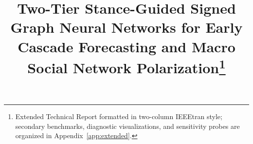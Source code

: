 \documentclass[conference]{IEEEtran}
\begin{document}
\title{Two-Tier Stance-Guided Signed Graph Neural Networks for Early Cascade Forecasting and Macro Social Network Polarization\thanks{Extended Technical Report formatted in two-column IEEEtran style; secondary benchmarks, diagnostic visualizations, and sensitivity probes are organized in Appendix~\ref{app:extended}.}}

\author{
\and
{}
}

\maketitle
\end{document}
